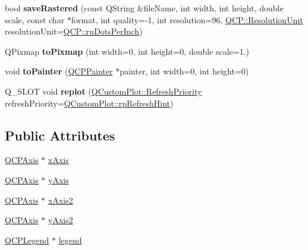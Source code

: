 \begin{DoxyCompactItemize}
\item 
bool {\bfseries save\+Rastered} (const Q\+String \&file\+Name, int width, int height, double scale, const char $\ast$format, int quality=-\/1, int resolution=96, \hyperlink{namespace_q_c_p_a715d46153da230990aa887d0f0602452}{Q\+C\+P\+::\+Resolution\+Unit} resolution\+Unit=\hyperlink{namespace_q_c_p_a715d46153da230990aa887d0f0602452a9def6fd83de9b4108ad999541a42ac6a}{Q\+C\+P\+::ru\+Dots\+Per\+Inch})\hypertarget{class_q_custom_plot_ad7723ce2edfa270632ef42b03a444352}{}\label{class_q_custom_plot_ad7723ce2edfa270632ef42b03a444352}

\item 
Q\+Pixmap {\bfseries to\+Pixmap} (int width=0, int height=0, double scale=1.)\hypertarget{class_q_custom_plot_aabb974d71ce96c137dc04eb6eab844fe}{}\label{class_q_custom_plot_aabb974d71ce96c137dc04eb6eab844fe}

\item 
void {\bfseries to\+Painter} (\hyperlink{class_q_c_p_painter}{Q\+C\+P\+Painter} $\ast$painter, int width=0, int height=0)\hypertarget{class_q_custom_plot_a1be68d5c0f1e086d6374d1340a193fb9}{}\label{class_q_custom_plot_a1be68d5c0f1e086d6374d1340a193fb9}

\item 
Q\+\_\+\+S\+L\+OT void {\bfseries replot} (\hyperlink{class_q_custom_plot_a45d61392d13042e712a956d27762aa39}{Q\+Custom\+Plot\+::\+Refresh\+Priority} refresh\+Priority=\hyperlink{class_q_custom_plot_a45d61392d13042e712a956d27762aa39a5349b4ed6366760e34653bc54613a5ad}{Q\+Custom\+Plot\+::rp\+Refresh\+Hint})\hypertarget{class_q_custom_plot_a924548f2f315d94811af92704340e15a}{}\label{class_q_custom_plot_a924548f2f315d94811af92704340e15a}

\end{DoxyCompactItemize}
\subsection*{Public Attributes}
\begin{DoxyCompactItemize}
\item 
\hyperlink{class_q_c_p_axis}{Q\+C\+P\+Axis} $\ast$ \hyperlink{class_q_custom_plot_a9a79cd0158a4c7f30cbc702f0fd800e4}{x\+Axis}
\item 
\hyperlink{class_q_c_p_axis}{Q\+C\+P\+Axis} $\ast$ \hyperlink{class_q_custom_plot_af6fea5679725b152c14facd920b19367}{y\+Axis}
\item 
\hyperlink{class_q_c_p_axis}{Q\+C\+P\+Axis} $\ast$ \hyperlink{class_q_custom_plot_ada41599f22cad901c030f3dcbdd82fd9}{x\+Axis2}
\item 
\hyperlink{class_q_c_p_axis}{Q\+C\+P\+Axis} $\ast$ \hyperlink{class_q_custom_plot_af13fdc5bce7d0fabd640f13ba805c0b7}{y\+Axis2}
\item 
\hyperlink{class_q_c_p_legend}{Q\+C\+P\+Legend} $\ast$ \hyperlink{class_q_custom_plot_a4eadcd237dc6a09938b68b16877fa6af}{legend}
\end{DoxyCompactItemize}

